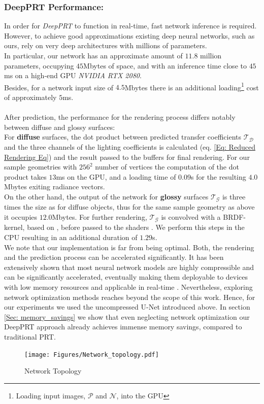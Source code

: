 \subsubsection*{DeepPRT Performance: \\}
In order for \textit{DeepPRT} to function in real-time, fast network inference is required. However, to achieve good approximations existing deep neural networks, such as ours, rely on very deep architectures with millions of parameters. 
\\
In particular, our network has an approximate amount of $11.8$ million parameters, occupying $45$Mbytes of space, and with an inference time close to $45$ms on a high-end GPU \textit{NVIDIA RTX 2080}. \\
Besides, for a network input size of $4.5$Mbytes there is an additional loading\footnote{Loading input images, $\mathcal{P}$ and $\mathcal{N}$, into the GPU} cost of approximately $5$ms.  
\\
\\
After prediction, the performance for the rendering process differs notably between diffuse and glossy surfaces:
\\ 
For \textbf{diffuse} surfaces, the dot product between predicted transfer coefficients $\mathcal{T_D}$ and the three channels of the lighting coefficients is calculated (eq. \ref{Eq: Reduced Rendering Eq}) and the result passed to the buffers for final rendering.  For our sample geometries with $256^2$ number of vertices the computation of the dot product takes $13$ms on the GPU, and a loading time of $0.09$s for the resulting $4.0$Mbytes exiting radiance vectors.
\\ 
On the other hand, the output of the network for \textbf{glossy} surfaces $\mathcal{T_G}$ is three times the size as for diffuse objects, thus for the same sample geometry as above it occupies $12.0$Mbytes. For further rendering,  $\mathcal{T_G}$ is convolved with a BRDF-kernel, based on \cite{ BRDF_kernel}, before passed to the shaders \cite{sloan2002precomputed}.  We perform this steps in the CPU resulting in an additional duration of $1.29$s. 
\\
We note that our implementation is far from being optimal.  Both, the rendering and the prediction process can be accelerated significantly. It has been extensively shown that most neural network models are highly compressible and can be significantly accelerated, eventually making them deployable to devices with low memory resources and applicable in real-time \cite{Deep_Compression, Survey_NN_Compression}.
Nevertheless, exploring network optimization methods reaches beyond the scope of this work. Hence, for our experiments we used the uncompressed U-Net introduced above. In section \ref{Sec: memory_savings} we show that even neglecting network optimization our DeepPRT approach already achieves immense memory savings, compared to traditional PRT. 
\begin{figure}[t]
  \centering
    \texttt{[image: Figures/Network\_topology.pdf]}
     \caption{Network Topology}
     \label{Fig: NetworkTopology}
\end{figure}

  


